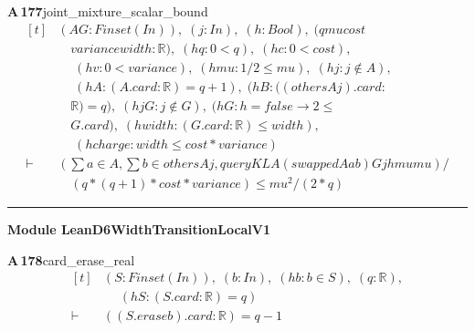 \documentclass[conference]{IEEEtran}
\theoremstyle{definition}
\newcommand{\lean}[1]{\textsf{\footnotesize #1}}
\begin{document}
\noindent\textbf{A\,177}\quad\lean{joint\_mixture\_scalar\_bound}
{\footnotesize\[ \begin{aligned}[t]
&(\mathit{A} \mathit{G} : \mathit{Finset} (\mathit{I} \mathit{n})),\; (\mathit{j} : \mathit{I} \mathit{n}),\; (\mathit{h} : \mathit{Bool}),\; (\mathit{q} \mathit{mu} \mathit{cost}\\
&\quad \mathit{variance} \mathit{width} : \mathbb{R} ),\; (\mathit{hq} : 0<\mathit{q}),\; (\mathit{hc} : 0<\mathit{cost}),\\
&\quad \; (\mathit{hv} : 0<\mathit{variance}),\; (\mathit{hmu} : 1/2 \leq \mathit{mu}),\; (\mathit{hj} : \mathit{j} \notin \mathit{A}),\\
&\quad \; (\mathit{hA} : (\mathit{A}.\mathit{card}:\mathbb{R} )=\mathit{q}+1),\; (\mathit{hB} : ((\mathit{others} \mathit{A} \mathit{j}).\mathit{card}:\\
&\quad \mathbb{R} )=\mathit{q}),\; (\mathit{hjG} : \mathit{j} \notin \mathit{G}),\; (\mathit{hG} : \mathit{h}=\mathit{false} \to 2 \leq\\
&\quad \mathit{G}.\mathit{card}),\; (\mathit{hwidth} : (\mathit{G}.\mathit{card}:\mathbb{R} ) \leq \mathit{width}),\\
&\quad \; (\mathit{hcharge} : \mathit{width} \leq \mathit{cost}*\mathit{variance})\\
\vdash\;&(\textstyle\sum \mathit{a} \in \mathit{A},\textstyle\sum \mathit{b} \in \mathit{others} \mathit{A} \mathit{j},\mathit{queryKL} \mathit{A} (\mathit{swapped} \mathit{A} \mathit{a} \mathit{b}) \mathit{G} \mathit{j} \mathit{h} \mathit{mu} \mathit{mu})/\\
&\quad (\mathit{q}*(\mathit{q}+1)*\mathit{cost}*\mathit{variance}) \leq \mathit{mu}^{2}/(2*\mathit{q})
\end{aligned} \]}

\vspace{4pt}\noindent\rule{\columnwidth}{0.4pt}\par\vspace{2pt}
\noindent\textbf{Module \lean{LeanD6WidthTransitionLocalV1}}\par\vspace{3pt}

\noindent\textbf{A\,178}\quad\lean{card\_erase\_real}
{\footnotesize\[ \begin{aligned}[t]
&(\mathit{S} : \mathit{Finset} (\mathit{I} \mathit{n})),\; (\mathit{b} : \mathit{I} \mathit{n}),\; (\mathit{hb} : \mathit{b} \in \mathit{S}),\; (\mathit{q} : \mathbb{R} ),\\
&\quad \; (\mathit{hS} : (\mathit{S}.\mathit{card} : \mathbb{R} ) = \mathit{q})\\
\vdash\;&((\mathit{S}.\mathit{erase} \mathit{b}).\mathit{card} : \mathbb{R} ) = \mathit{q}-1
\end{aligned} \]}
\end{document}
